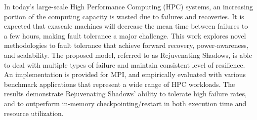 In today's large-scale High Performance Computing (HPC) systems, an increasing portion of the computing capacity is wasted due to failures and recoveries. It is expected that exascale machines will decrease the mean time between failures to a few hours, making fault tolerance a major challenge. This work explores novel methodologies to fault tolerance that achieve forward recovery, power-awareness, and scalability. The proposed model, referred to as Rejuvenating Shadows, is able to deal with multiple types of failure and maintain consistent level of resilience. An implementation is provided for MPI, and empirically evaluated with various benchmark applications that represent a wide range of HPC workloads. The results demonstrate Rejuvenating Shadows' ability to tolerate high failure rates, and to outperform in-memory checkpointing/restart in both execution time and resource utilization.


